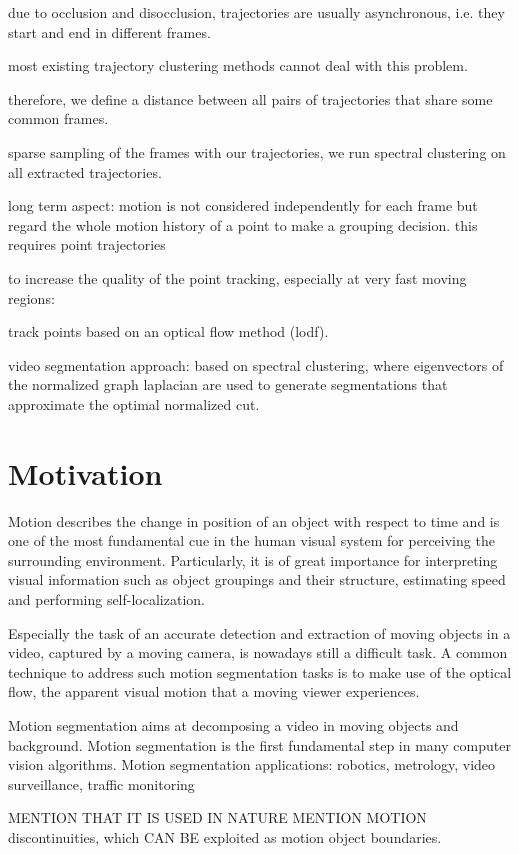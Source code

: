 due to occlusion and disocclusion, 
trajectories are usually asynchronous, i.e. they start and end in different frames. 

most existing trajectory clustering methods cannot deal with this problem. 

therefore, we define a distance between all pairs of trajectories that share some common frames.

sparse sampling of the frames with our trajectories, 
we run spectral clustering on all extracted trajectories.


long term aspect: motion is not considered independently for each frame but regard the whole motion history of a point to make a grouping decision.
this requires point trajectories

to increase the quality of the point tracking, especially at very fast moving regions: 

track points based on an optical flow method (lodf). 

video segmentation approach: based on spectral clustering, where eigenvectors of the normalized graph laplacian are used to generate segmentations that approximate the optimal normalized cut.


\section{Motivation}

Motion describes the change in position of an object with respect to time and is one of the most fundamental cue in the human visual system for perceiving the surrounding environment. Particularly, it is of great importance for interpreting visual information such as object groupings and their structure, estimating speed and performing self-localization.

Especially the task of an accurate detection and extraction of moving objects in a video, captured by a moving camera, is nowadays still a difficult task. A common technique to address such motion segmentation tasks is to make use of the optical flow, the apparent visual motion that a moving viewer experiences. 



Motion segmentation aims at decomposing a video in moving objects and background.
Motion segmentation is the first fundamental step in many computer vision algorithms.
Motion segmentation applications: robotics, metrology, video surveillance, traffic monitoring


MENTION THAT IT IS USED IN NATURE
MENTION MOTION discontinuities, which CAN BE exploited as motion object boundaries.


